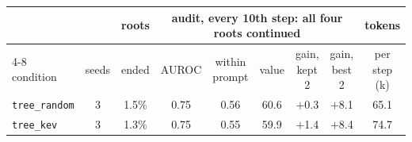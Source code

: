 \begin{tabular}{@{}lcccccccc@{}}
\toprule
 & & roots & \multicolumn{5}{c}{audit, every 10th step: all four roots continued} & tokens \\ \cmidrule(lr){4-8}
condition & seeds & ended & AUROC & within prompt & value & gain, kept 2 & gain, best 2 & per step (k) \\ \midrule
\texttt{tree\_random} & 3 & 1.5\% & 0.75 & 0.56 & 60.6 & $+$0.3 & $+$8.1 & 65.1 \\
\texttt{tree\_kev} & 3 & 1.3\% & 0.75 & 0.55 & 59.9 & $+$1.4 & $+$8.4 & 74.7 \\
\bottomrule
\end{tabular}
